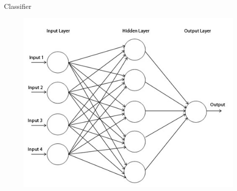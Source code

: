 \documentclass{beamer}
\begin{document}


\begin{frame}{Classifier}

\begin{figure}
  \begin{center}
  \includegraphics[scale=0.5]{images/MLP.jpg}
  \end{center}
  \end{figure}

\end{frame}

\end{document}
